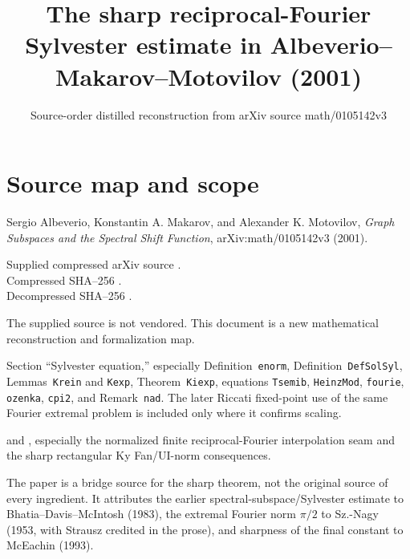 
\title{The sharp reciprocal-Fourier Sylvester estimate in Albeverio--Makarov--Motovilov (2001)}
\author{}
\date{Source-order distilled reconstruction from arXiv source math/0105142v3}

\maketitle

\section*{Source map and scope}
\begin{sourceguide}
\item[Primary source] Sergio Albeverio, Konstantin A. Makarov, and Alexander K. Motovilov, \emph{Graph Subspaces and the Spectral Shift Function}, arXiv:math/0105142v3 (2001).
\item[Local evidence] Supplied compressed arXiv source .\\
Compressed SHA--256 \texttt{}.\\
Decompressed  SHA--256 \texttt{}.
\item[Redistribution] The supplied source is not vendored. This document is a new mathematical reconstruction and formalization map.
\item[Coverage] Section ``Sylvester equation,'' especially Definition~\texttt{enorm}, Definition~\texttt{DefSolSyl}, Lemmas~\texttt{Krein} and \texttt{Kexp}, Theorem~\texttt{Kiexp}, equations \texttt{Tsemib}, \texttt{HeinzMod}, \texttt{fourie}, \texttt{ozenka}, \texttt{cpi2}, and Remark~\texttt{nad}. The later Riccati fixed-point use of the same Fourier extremal problem is included only where it confirms scaling.
\item[Formalization target]  and , especially the normalized finite reciprocal-Fourier interpolation seam and the sharp rectangular Ky Fan/UI-norm consequences.
\item[Attribution boundary] The paper is a bridge source for the sharp theorem, not the original source of every ingredient. It attributes the earlier spectral-subspace/Sylvester estimate to Bhatia--Davis--McIntosh (1983), the extremal Fourier norm $\pi/2$ to Sz.-Nagy (1953, with Strausz credited in the prose), and sharpness of the final constant to McEachin (1993).
\end{sourceguide}

